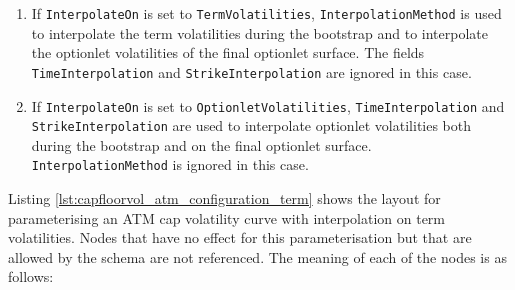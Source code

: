 \begin{enumerate}
\item If \lstinline!InterpolateOn! is set to \lstinline!TermVolatilities!, \lstinline!InterpolationMethod! is used to interpolate the term volatilities during the bootstrap and to interpolate the optionlet volatilities of the final optionlet surface. The fields \lstinline!TimeInterpolation! and \lstinline!StrikeInterpolation! are ignored in this case.
\item If \lstinline!InterpolateOn! is set to \lstinline!OptionletVolatilities!, \lstinline!TimeInterpolation! and \lstinline!StrikeInterpolation! are used to interpolate optionlet volatilities both during the bootstrap and on the final optionlet surface. \lstinline!InterpolationMethod! is ignored in this case.
\end{enumerate}


Listing \ref{lst:capfloorvol_atm_configuration_term} shows the layout for parameterising an ATM cap volatility curve
with interpolation on term volatilities. Nodes that have no effect for this parameterisation but that are allowed by the
schema are not referenced. The meaning of each of the nodes is as follows:

